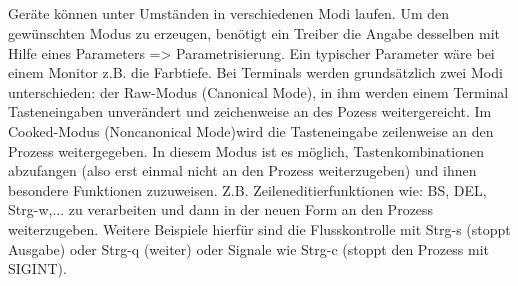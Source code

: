 \subsection{}
\begin{answer}
Geräte können unter Umständen in verschiedenen Modi laufen. Um den gewünschten Modus zu
erzeugen, benötigt ein Treiber die Angabe desselben mit Hilfe eines Parameters => Parametrisierung.
Ein typischer Parameter wäre bei einem Monitor z.B. die Farbtiefe.
Bei Terminals werden grundsätzlich zwei Modi unterschieden: der Raw-Modus (Canonical Mode),
in ihm werden einem Terminal Tasteneingaben unverändert und zeichenweise an des Pozess
weitergereicht. Im Cooked-Modus (Noncanonical Mode)wird die Tasteneingabe zeilenweise an den
Prozess weitergegeben. In diesem Modus ist es möglich, Tastenkombinationen abzufangen (also
erst einmal nicht an den Prozess weiterzugeben) und ihnen besondere Funktionen zuzuweisen.
Z.B. Zeileneditierfunktionen wie: BS, DEL, Strg-w,... zu verarbeiten und dann in der neuen Form
an den Prozess weiterzugeben. Weitere Beispiele hierfür sind die Flusskontrolle mit Strg-s (stoppt
Ausgabe) oder Strg-q (weiter) oder Signale wie Strg-c (stoppt den Prozess mit SIGINT).
\end{answer}